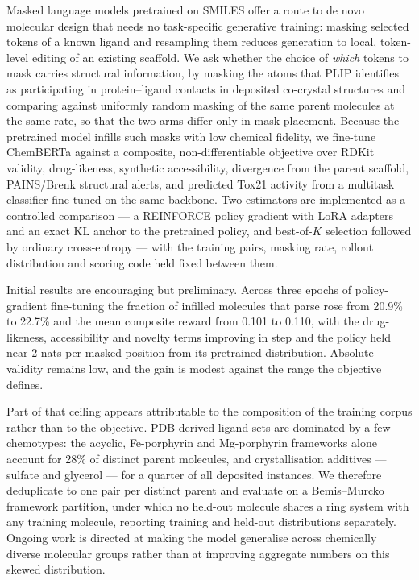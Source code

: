 
Masked language models pretrained on SMILES offer a route to de novo molecular
design that needs no task-specific generative training: masking selected tokens
of a known ligand and resampling them reduces generation to local, token-level
editing of an existing scaffold. We ask whether the choice of \emph{which}
tokens to mask carries structural information, by masking the atoms that PLIP
identifies as participating in protein--ligand contacts in deposited
co-crystal structures and comparing against uniformly random masking of the
same parent molecules at the same rate, so that the two arms differ only in
mask placement. Because the pretrained model infills such masks with low
chemical fidelity, we fine-tune ChemBERTa against a composite, non-differentiable
objective over RDKit validity, drug-likeness, synthetic accessibility,
divergence from the parent scaffold, PAINS/Brenk structural alerts, and
predicted Tox21 activity from a multitask classifier fine-tuned on the same
backbone. Two estimators are implemented as a controlled comparison --- a
REINFORCE policy gradient with LoRA adapters and an exact KL anchor to the
pretrained policy, and best-of-$K$ selection followed by ordinary
cross-entropy --- with the training pairs, masking rate, rollout distribution
and scoring code held fixed between them.

Initial results are encouraging but preliminary. Across three epochs of
policy-gradient fine-tuning the fraction of infilled molecules that parse rose
from 20.9\% to 22.7\% and the mean composite reward from 0.101 to 0.110, with
the drug-likeness, accessibility and novelty terms improving in step and the
policy held near 2 nats per masked position from its pretrained distribution.
Absolute validity remains low, and the gain is modest against the range the
objective defines.

Part of that ceiling appears attributable to the composition of the training
corpus rather than to the objective. PDB-derived ligand sets are dominated by
a few chemotypes: the acyclic, Fe-porphyrin and Mg-porphyrin frameworks alone
account for 28\% of distinct parent molecules, and crystallisation additives
--- sulfate and glycerol --- for a quarter of all deposited instances. We
therefore deduplicate to one pair per distinct parent and evaluate on a
Bemis--Murcko framework partition, under which no held-out molecule shares a
ring system with any training molecule, reporting training and held-out
distributions separately. Ongoing work is directed at making the model
generalise across chemically diverse molecular groups rather than at improving
aggregate numbers on this skewed distribution.

